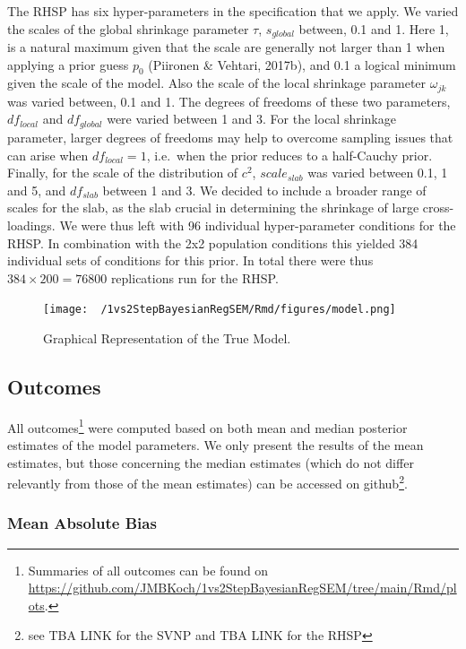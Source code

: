 \documentclass[
  english,
  man, donotrepeattitle,floatsintext]{apa6}
\begin{document}
The RHSP has six hyper-parameters in the specification that we apply. We varied the scales of the global shrinkage parameter \(\tau\), \(s_{global}\) between, 0.1 and 1. Here 1, is a natural maximum given that the scale are generally not larger than 1 when applying a prior guess \(p_0\) (Piironen \& Vehtari, 2017b), and 0.1 a logical minimum given the scale of the model. Also the scale of the local shrinkage parameter \(\omega_{jk}\) was varied between, 0.1 and 1. The degrees of freedoms of these two parameters, \(df_{local}\) and \(df_{global}\) were varied between 1 and 3. For the local shrinkage parameter, larger degrees of freedoms may help to overcome sampling issues that can arise when \(df_{local} = 1\), i.e.~when the prior reduces to a half-Cauchy prior. Finally, for the scale of the distribution of \(c^2\), \(scale_{slab}\) was varied between 0.1, 1 and 5, and \(df_{slab}\) between 1 and 3. We decided to include a broader range of scales for the slab, as the slab crucial in determining the shrinkage of large cross-loadings. We were thus left with 96 individual hyper-parameter conditions for the RHSP. In combination with the 2x2 population conditions this yielded 384 individual sets of conditions for this prior. In total there were thus \(384 \times 200 = 76800\) replications run for the RHSP.

\begin{figure}
\centering
\texttt{[image: ~/1vs2StepBayesianRegSEM/Rmd/figures/model.png]}
\caption{Graphical Representation of the True Model.}
\end{figure}

\hypertarget{outcomes}{%
\subsection{Outcomes}\label{outcomes}}

All outcomes\footnote{Summaries of all outcomes can be found on \url{https://github.com/JMBKoch/1vs2StepBayesianRegSEM/tree/main/Rmd/plots}.} were computed based on both mean and median posterior estimates of the model parameters. We only present the results of the mean estimates, but those concerning the median estimates (which do not differ relevantly from those of the mean estimates) can be accessed on github\footnote{see TBA LINK for the SVNP and TBA LINK for the RHSP}.

\hypertarget{mean-absolute-bias}{%
\subsubsection{Mean Absolute Bias}\label{mean-absolute-bias}}
\end{document}
